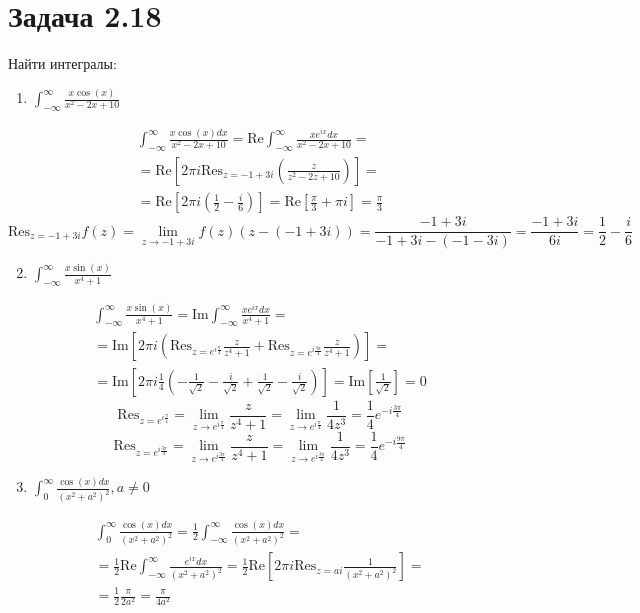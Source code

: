 \documentclass[11pt]{article}
\author{Sergey Makarov}
\date{\today}
\title{}
\begin{document}
\section{Задача 2.18}
\label{sec:orgdc2a4a0}
Найти интегралы:
\begin{enumerate}
\item \(\int_{-\infty}^\infty\frac{x\cos(x)}{x^2 - 2x + 10}\)
\end{enumerate}
\begin{multline*}
\int_{-\infty}^\infty\frac{x\cos(x)dx}{x^2 - 2x + 10} = \mathrm{Re}\int_{-\infty}^\infty\frac{xe^{ix}dx}{x^2-2x+10} = \\
= \mathrm{Re}\left[2\pi i \mathrm{Res}_{z=-1+3i}\left(\frac{z}{z^2-2z+10}\right)\right] = \\
= \mathrm{Re}\left[2\pi i(\frac{1}{2} - \frac{i}{6})\right] = \mathrm{Re}\left[\frac{\pi}{3} + \pi i\right] = \frac{\pi}{3}
\end{multline*}
$$\mathrm{Res}_{z=-1+3i}f(z) = \lim_{z \to -1 + 3i}f(z)(z - (-1 + 3i)) = \frac{-1 + 3i}{-1 + 3i - (-1 - 3i)} = \frac{-1 + 3i}{6i} = \frac{1}{2} - \frac{i}{6}$$
\begin{enumerate}
\setcounter{enumi}{1}
\item \(\int_{-\infty}^\infty\frac{x\sin(x)}{x^4 + 1}\)
\end{enumerate}
\begin{multline*}
\int_{-\infty}^\infty\frac{x\sin(x)}{x^4 + 1} = \mathrm{Im}\int_{-\infty}^\infty\frac{xe^{ix}dx}{x^4+1} = \\
= \mathrm{Im}\left[2\pi i\left(\mathrm{Res}_{z=e^{i\frac{\pi}{4}}}\frac{z}{z^4+1} + \mathrm{Res}_{z=e^{i\frac{3\pi}{4}}}\frac{z}{z^4+1}\right)\right] = \\
 = \mathrm{Im}\left[2\pi i\frac{1}{4}\left(-\frac{1}{\sqrt 2} - \frac{i}{\sqrt 2} + \frac{1}{\sqrt 2} - \frac{i}{\sqrt 2}\right)\right] = \mathrm{Im}\left[\frac{1}{\sqrt 2}\right] = 0
\end{multline*}
$$\mathrm{Res}_{z=e^{i\frac{\pi}{4}}} = \lim_{z \to e^{i\frac{\pi}{4}}}\frac{z}{z^4+1} = \lim_{z \to e^{i\frac{\pi}{4}}}\frac{1}{4z^3} = \frac{1}{4}e^{-i\frac{3\pi}{4}}$$
$$\mathrm{Res}_{z=e^{i\frac{3\pi}{4}}} = \lim_{z \to e^{i\frac{3\pi}{4}}}\frac{z}{z^4+1} = \lim_{z \to e^{i\frac{3\pi}{4}}}\frac{1}{4z^3} = \frac{1}{4}e^{-i\frac{9\pi}{4}}$$
\begin{enumerate}
\setcounter{enumi}{2}
\item \(\int_0^\infty\frac{\cos(x)dx}{(x^2+a^2)^2}, a \ne 0\)
\end{enumerate}
\begin{multline*}
\int_0^\infty\frac{\cos(x)dx}{(x^2+a^2)^2} = \frac{1}{2}\int_{-\infty}^\infty\frac{\cos(x)dx}{(x^2+a^2)^2} = \\
 = \frac{1}{2}\mathrm{Re}\int_{-\infty}^\infty\frac{e^{ix}dx}{(x^2+a^2)^2} = \frac{1}{2}\mathrm{Re}\left[2\pi i\mathrm{Res}_{z=ai}\frac{1}{(x^2+a^2)^2}\right] = \\
 = \frac{1}{2}\frac{\pi}{2a^2} = \frac{\pi}{4a^2}
\end{multline*}
\end{document}
